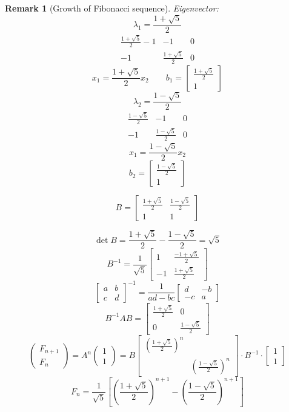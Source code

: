 \documentclass{article}
\newcounter{lecref}[section]
\numberwithin{lecref}{section}
\newtheorem{remark}[lecref]{Remark}
\newcommand{\vectwo}[2]{\begin{pmatrix} #1 \\ #2 \end{pmatrix}}
\begin{document}
\begin{remark}[Growth of Fibonacci sequence]
  Eigenvector:
  \[ \lambda_1 = \frac{1 + \sqrt5}{2} \]
  \[
    \begin{array}{cc|c}
      \frac{1 + \sqrt5}{2} - 1 & -1 & 0 \\
      -1 & \frac{1 + \sqrt5}{2} & 0
    \end{array}
  \] \[
    x_1 = \frac{1 + \sqrt5}{2} x_2 \qquad b_1 = \begin{bmatrix} \frac{1 + \sqrt5}{2} \\ 1 \end{bmatrix}
  \] \[
    \lambda_2 = \frac{1 - \sqrt5}{2}
  \] \[
    \begin{array}{cc|c}
      \frac{1 - \sqrt5}{2} & -1 & 0 \\
      -1 & \frac{1 - \sqrt5}{2} & 0
    \end{array}
  \]
  \[ x_1 = \frac{1 - \sqrt5}{2} x_2 \]
  \[ b_2 = \begin{bmatrix} \frac{1 - \sqrt5}{2} \\ 1 \end{bmatrix} \]

  \[ B = \begin{bmatrix} \frac{1 + \sqrt5}{2} & \frac{1 - \sqrt5}{2} \\ 1 & 1 \end{bmatrix} \]

  \[ \det{B} = \frac{1 + \sqrt5}{2} - \frac{1 - \sqrt5}{2} = \sqrt5 \]
  \[ B^{-1} = \frac{1}{\sqrt5} \begin{bmatrix} 1 & \frac{-1 + \sqrt5}{2} \\ -1 & \frac{1 + \sqrt5}{2} \end{bmatrix} \]
  \[ \begin{bmatrix} a & b \\ c & d \end{bmatrix}^{-1} = \frac{1}{ad - bc} \begin{bmatrix} d & -b \\ -c & a \end{bmatrix} \]
  \[ B^{-1} AB = \begin{bmatrix} \frac{1 + \sqrt5}{2} & 0 \\ 0 & \frac{1 - \sqrt5}{2} \end{bmatrix} \]
  \[ \vectwo{F_{n+1}}{F_n} = A^n \vectwo11 = B \begin{bmatrix} (\frac{1 + \sqrt5}{2})^n & \\ & (\frac{1 - \sqrt5}{2})^n \end{bmatrix} \cdot B^{-1} \cdot \begin{bmatrix} 1 \\ 1\end{bmatrix} \]
  \[ F_n = \frac1{\sqrt5} \left[\left(\frac{1 + \sqrt5}{2}\right)^{n+1} - \left(\frac{1 - \sqrt5}{2}\right)^{n+1}\right] \]


\end{remark}
\end{document}
